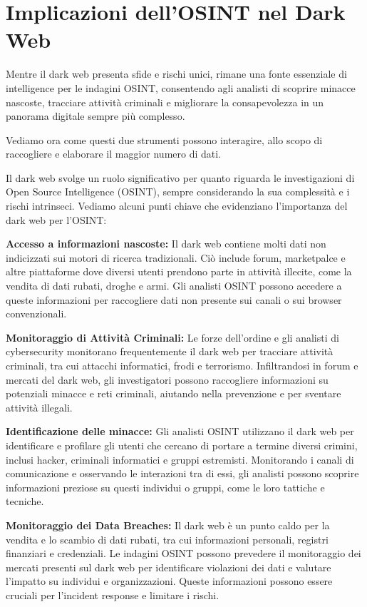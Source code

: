 \chapter{Implicazioni dell'OSINT nel Dark Web}\label{chapter:Implicazioni}

Mentre il dark web presenta sfide e rischi unici, rimane una fonte essenziale di intelligence per le indagini OSINT, consentendo agli analisti di scoprire minacce nascoste, tracciare attività criminali e migliorare la consapevolezza in un panorama digitale sempre più complesso.

Vediamo ora come questi due strumenti possono interagire, allo scopo di raccogliere e elaborare il maggior numero di dati.

Il dark web svolge un ruolo significativo per quanto riguarda le investigazioni di Open Source Intelligence (OSINT), sempre considerando la sua complessità e i rischi intrinseci. Vediamo alcuni punti chiave che evidenziano l'importanza del dark web per l'OSINT:

\textbf{Accesso a informazioni nascoste:} Il dark web contiene molti dati non indicizzati sui motori di ricerca tradizionali. Ciò include forum, marketpalce e altre piattaforme dove diversi utenti prendono parte in attività illecite, come la vendita di dati rubati, droghe e armi. Gli analisti OSINT possono accedere a queste informazioni per raccogliere dati non presente sui canali o sui browser convenzionali.


\textbf{Monitoraggio di Attività Criminali:} Le forze dell'ordine e gli analisti di cybersecurity monitorano frequentemente il dark web per tracciare attività criminali, tra cui attacchi informatici, frodi e terrorismo. Infiltrandosi in forum e mercati del dark web, gli investigatori possono raccogliere informazioni su potenziali minacce e reti criminali, aiutando nella prevenzione e per sventare attività illegali.

\textbf{Identificazione delle minacce:} Gli analisti OSINT utilizzano il dark web per identificare e profilare gli utenti che cercano di portare a termine diversi crimini, inclusi hacker, criminali informatici e gruppi estremisti. Monitorando i canali di comunicazione e osservando le interazioni tra di essi, gli analisti possono scoprire informazioni preziose su questi individui o gruppi, come le loro tattiche e tecniche.

\textbf{Monitoraggio dei Data Breaches:} Il dark web è un punto caldo per la vendita e lo scambio di dati rubati, tra cui informazioni personali, registri finanziari e credenziali. Le indagini OSINT possono prevedere il monitoraggio dei mercati presenti sul dark web per identificare violazioni dei dati e valutare l'impatto su individui e organizzazioni. Queste informazioni possono essere cruciali per l'incident response e limitare i rischi.


